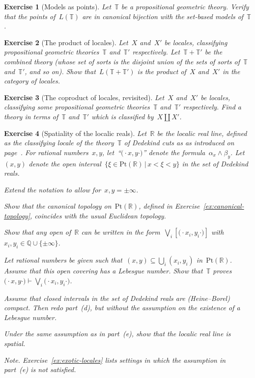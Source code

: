 \documentclass{ws-rv9x6}
\newtheorem{ex}{Exercise}
\newenvironment{exercise}[1]{
  \begin{ex}[#1]
}{\end{ex}}
\newcommand{\QQ}{\mathbb{Q}}
\newcommand{\RR}{\mathbb{R}}
\newcommand{\TT}{\mathbb{T}}
\renewcommand{\_}{\mathpunct{.}}
\newcommand{\?}{\,{:}\,}
\newcommand{\Pt}{\mathrm{Pt}}
\begin{document}
\begin{exercise}{Models as points}%
Let~$\TT$ be a propositional geometric theory. Verify that the points
of~$L(\TT)$ are in canonical bijection with the set-based models of~$\TT$.
\end{exercise}

\begin{exercise}{The product of locales}\label{ex:products-of-locales}%
Let~$X$ and~$X'$ be locales, classifying propositional geometric
theories~$\TT$ and~$\TT'$ respectively. Let~$\TT + \TT'$ be the combined theory
(whose set of sorts is the disjoint union of the sets of sorts of~$\TT$
and~$\TT'$, and so on). Show that~$L(\TT + \TT')$ is the product of~$X$
and~$X'$ in the category of locales.
\end{exercise}

\begin{exercise}{The coproduct of locales, revisited}%
Let~$X$ and~$X'$ be locales, classifying some propositional geometric
theories~$\TT$ and~$\TT'$ respectively. Find a theory in terms of~$\TT$
and~$\TT'$ which is classified by~$X \amalg X'$.
\end{exercise}

\begin{exercise}{Spatiality of the localic reals}%
\label{ex:spatiality-reals}%
\newcommand{\fa}{\ensuremath{(\!\cdot}}%
\newcommand{\fb}{\ensuremath{\cdot\!)}}%
Let~$\RR$ be the localic real line, defined as the classifying locale of the
theory~$\TT$ of Dedekind cuts as as introduced on
page~\pageref{par:dedekind-cuts}. For rational numbers~$x,y$, let~``$\fa x,y
\fb$'' denote the formula~$\alpha_x \wedge \beta_y$. Let~$(x,y)$ denote the
open interval~$\{ \xi \in \Pt(\RR) \,|\, x < \xi < y \}$ in the set of Dedekind reals.
\begin{alphlist}[(f)]
\item Extend the notation to allow for~$x,y=\pm\infty$.
\item Show that the canonical topology on~$\Pt(\RR)$, defined in
Exercise~\ref{ex:canonical-topology}, coincides with the usual Euclidean
topology.
\item Show that any open of~$\RR$ can be written in the form~$\bigvee_i
[\fa x_i,y_i \fb]$ with~$x_i,y_i \in \QQ \cup \{\pm\infty\}$.
\item Let rational numbers be given such that~$(x,y) \subseteq \bigcup_i
(x_i,y_i)$ in~$\Pt(\RR)$. Assume that this open covering has a Lebesgue number.
Show that~$\TT$ proves~$\fa x,y \fb \vdash \bigvee_i \fa x_i,y_i \fb$.
\item Assume that closed intervals in the set of Dedekind reals are
(Heine--Borel) compact. Then redo part~(d), but without the assumption on the
existence of a Lebesgue number.
\item Under the same assumption as in part~(e), show that the localic real line
is spatial.
\end{alphlist}
{\scriptsize\emph{Note.} Exercise~\ref{ex:exotic-locales} lists settings in
which the assumption in part~(e) is not satisfied.\par}
\end{exercise}
\end{document}
